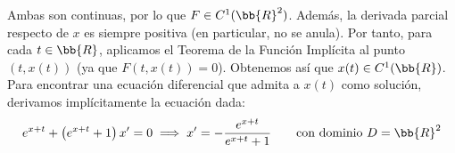\documentclass[12pt]{article}
\begin{document}
\begin{ejercicio}
        Ambas son continuas, por lo que $F\in C^1(\bb{R}^2)$. Además, la derivada parcial respecto de $x$ es siempre positiva (en particular, no se anula). Por tanto, para cada $t\in \bb{R}$, aplicamos el Teorema de la Función Implícita al punto $(t,x(t))$ (ya que $F(t,x(t)) = 0$). Obtenemos así que $x(t)\in C^1(\bb{R})$.\\

        Para encontrar una ecuación diferencial que admita a $x(t)$ como solución, derivamos implícitamente la ecuación dada:
        \begin{equation*}
            e^{x+t} + \left(e^{x+t} + 1\right)x' = 0 \implies x' = -\frac{e^{x+t}}{e^{x+t} + 1} \qquad \text{con dominio } D=\bb{R}^2
        \end{equation*}
    \end{ejercicio}
\end{document}
